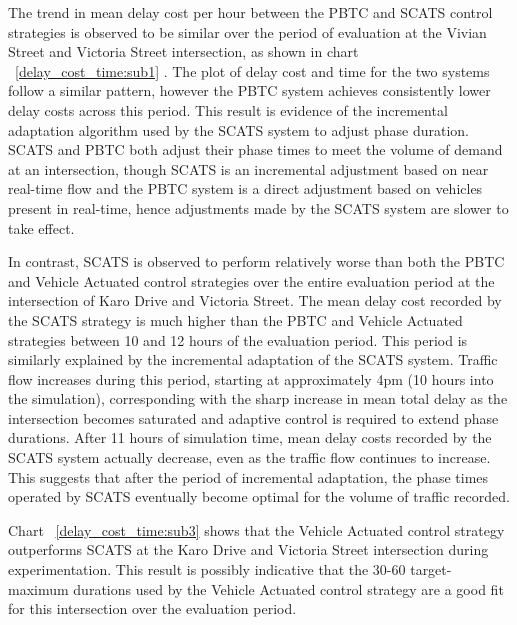The trend in mean delay cost per hour between the PBTC and SCATS control strategies is observed to be similar over the period of evaluation at the Vivian Street and Victoria Street intersection, as shown in chart ~\ref{delay_cost_time:sub1} . The plot of delay cost and time for the two systems follow a similar pattern, however the PBTC system achieves consistently lower delay costs across this period. This result is evidence of the incremental adaptation algorithm used by the SCATS system to adjust phase duration. SCATS and PBTC both adjust their phase times to meet the volume of demand at an intersection, though SCATS is an incremental adjustment based on near real-time flow and the PBTC system is a direct adjustment based on vehicles present in real-time, hence adjustments made by the SCATS system are slower to take effect.

In contrast, SCATS is observed to perform relatively worse than both the PBTC and Vehicle Actuated control strategies over the entire evaluation period at the intersection of Karo Drive and Victoria Street. The mean delay cost recorded by the SCATS strategy is much higher than the PBTC and Vehicle Actuated strategies between 10 and 12 hours of the evaluation period. This period is similarly explained by the incremental adaptation of the SCATS system. Traffic flow increases during this period, starting at approximately 4pm (10 hours into the simulation), corresponding with the sharp increase in mean total delay as the intersection becomes saturated and adaptive control is required to extend phase durations. After 11 hours of simulation time, mean delay costs recorded by the SCATS system actually decrease, even as the traffic flow continues to increase. This suggests that after the period of incremental adaptation, the phase times operated by SCATS eventually become optimal for the volume of traffic recorded. 

Chart ~\ref{delay_cost_time:sub3} shows that the Vehicle Actuated control strategy outperforms SCATS at the Karo Drive and Victoria Street intersection during experimentation. This result is possibly indicative that the 30-60 target-maximum durations used by the Vehicle Actuated control strategy are a good fit for this intersection over the evaluation period.

